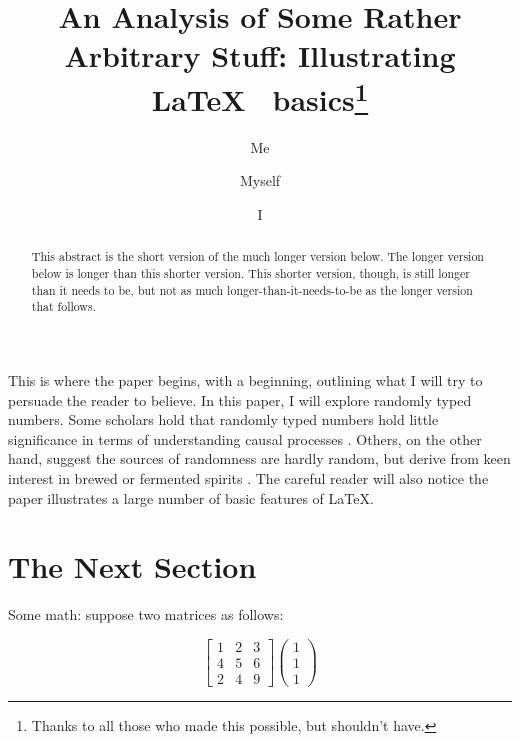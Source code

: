 \documentclass[12pt]{article}
\begin{document}
\vspace{50mm}


\title{An Analysis of Some Rather Arbitrary Stuff: Illustrating \LaTeX~  basics\thanks{Thanks to all those who made this possible, but shouldn't have.}}
 
\author{Me \and Myself \and I }

\maketitle \thispagestyle{empty}

\begin{abstract}

This abstract is the short version of the much longer version below.  The longer version below is longer than this shorter version. This shorter version, though, is still longer than it needs to be, but not as much longer-than-it-needs-to-be as the longer version that follows.

\end{abstract}
 \clearpage


\pagebreak
\thispagestyle{empty} \clearpage \pagebreak \pagestyle{plain}  \doublespace

This is where the paper begins, with a beginning, outlining what I will try to persuade the reader to believe. In this paper, I will explore randomly typed numbers. Some scholars hold that randomly typed numbers hold little significance in terms of understanding causal processes \cite{dover1999insignificance}. Others, on the other hand, suggest the sources of randomness are hardly random, but derive from keen interest in brewed or fermented spirits \cite{adams1766brewing}. The careful reader will also notice the paper illustrates a large number of basic features of \LaTeX. \cite{binmore85}

\section*{The Next Section}
 
 Some math: suppose two matrices as follows: 
 
$$\left[\begin{array}{ccc}1 & 2 & 3 \\4 & 5 & 6 \\2 & 4 & 9\end{array}\right]   \left(\begin{array}{c}1 \\1 \\1\end{array}\right)$$ 
\end{document}
